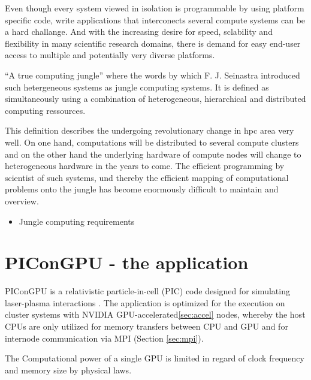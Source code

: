 Even though every system viewed in isolation is programmable by using
platform specific code, write applications that interconects several
compute systems can be a hard challange. And with the increasing
desire for speed, sclability and flexibility in many scientific research
domains, there is demand for easy end-user access to multiple and potentially
very diverse platforms.

``A true computing jungle'' where the words by which F. J. Seinastra
introduced such hetergeneous systems as jungle computing
systems\cite{ref:jungle}. It is defined as simultaneously using a
combination of heterogeneous, hierarchical and distributed computing
ressources.

This definition describes the undergoing revolutionary change in 
hpc area very well. On one hand, computations will be distributed
to several compute clusters and on the other hand the underlying
hardware of compute nodes will change to heterogeneous hardware in
the years to come. The efficient programming by scientist of such systems, 
und thereby the efficient mapping of computational problems onto
the jungle has become enormously difficult to maintain and overview.


\begin{itemize}
  \item Jungle computing requirements
\end{itemize}


\section{PIConGPU - the application}
\label{sec:picongpu}
PIConGPU is a relativistic particle-in-cell (PIC) code designed for
simulating laser-plasma interactions \cite{ref:picongpu}. The
application is optimized for the execution on cluster systems with
NVIDIA GPU-accelerated\ref{sec:accel} nodes, whereby the host CPUs are
only utilized for memory transfers between CPU and GPU and for
internode communication via MPI (Section \ref{sec:mpi}).

The Computational power of a single GPU is limited in regard of clock
frequency and memory size by physical laws.

